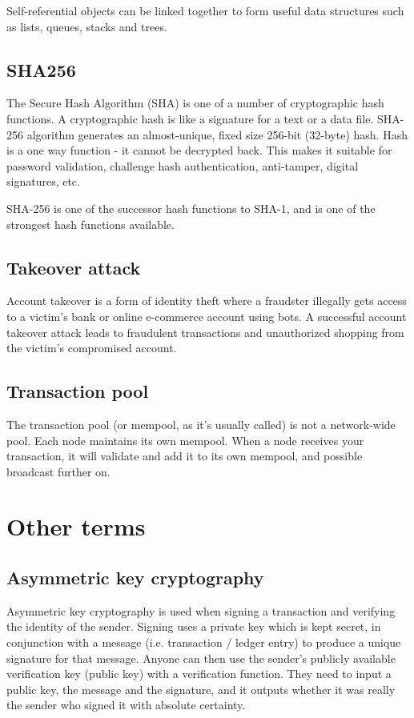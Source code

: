 \documentclass{article}
\begin{document}
Self-referential objects can be linked together to form useful data structures
such as lists, queues, stacks and trees.

\subsection{SHA256}
The Secure Hash Algorithm (SHA) is one of a number of cryptographic hash
functions. A cryptographic hash is like a signature for a text or a data file.
SHA-256 algorithm generates an almost-unique, fixed size 256-bit (32-byte)
hash. Hash is a one way function - it cannot be decrypted back. This makes it
suitable for password validation, challenge hash authentication, anti-tamper,
digital signatures, etc.

SHA-256 is one of the successor hash functions to SHA-1, and is one of the
strongest hash functions available.

\subsection{Takeover attack}
Account takeover is a form of identity theft where a fraudster illegally gets
access to a victim's bank or online e-commerce account using bots. A successful
account takeover attack leads to fraudulent transactions and unauthorized
shopping from the victim's compromised account.

\subsection{Transaction pool}
The transaction pool (or mempool, as it's usually called) is not a network-wide
pool. Each node maintains its own mempool. When a node receives your
transaction, it will validate and add it to its own mempool, and possible
broadcast further on.

\section{Other terms}

\subsection{Asymmetric key cryptography}
Asymmetric key cryptography is used when signing a transaction and verifying
the identity of the sender. Signing uses a private key which is kept secret,
in conjunction with a message (i.e. transaction / ledger entry) to produce a
unique signature for that message. Anyone can then use the sender's publicly
available verification key (public key) with a verification function. They
need to input a public key, the message and the signature, and it outputs
whether it was really the sender who signed it with absolute certainty.
\end{document}

